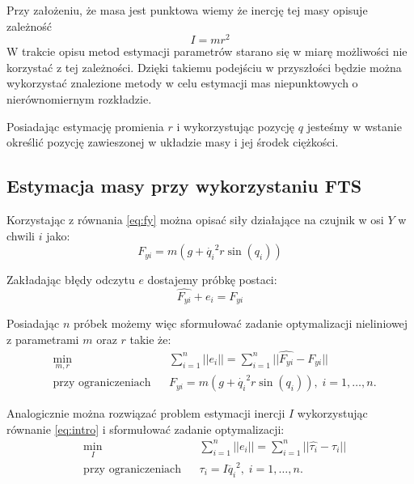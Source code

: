 \documentclass[12pt,a4paper]{article}
\begin{document}
	Przy założeniu, że masa jest punktowa wiemy że inercję tej masy opisuje zależność
	\begin{equation}
	I = mr^2
	\end{equation}
	W trakcie opisu metod estymacji parametrów starano się w miarę możliwości nie korzystać z tej zależności. Dzięki takiemu podejściu w przyszłości będzie można wykorzystać znalezione metody w celu estymacji mas niepunktowych o nierównomiernym rozkładzie.
	
	Posiadając estymację promienia $r$ i wykorzystując pozycję $q$ jesteśmy w wstanie określić pozycję zawieszonej w układzie masy i jej środek ciężkości.
	
	
	\subsection{Estymacja masy przy wykorzystaniu FTS}
	\label{sec:ftsods}
	Korzystając z równania \ref{eq:fy} można opisać siły działające na czujnik w osi $Y$ w chwili $i$ jako:
	\begin{equation}
	F_{yi}  = m(g + \dot{q_i}^2r\sin{(q_i)})
	\end{equation}
	
	Zakładając błędy odczytu $e$ dostajemy próbkę postaci:
	\begin{equation}
	\hat{F_{yi}}+e_i  = F_{yi}
	\end{equation}
	
	Posiadając $n$ próbek możemy więc sformułować zadanie optymalizacji nieliniowej z parametrami $m$ oraz $r$ takie że:
	\begin{equation}
	\begin{aligned}
	& \underset{m, r}{\text{min}}
	& & \sum_{i = 1}^{n} || e_i || = \sum_{i = 1}^{n} || \hat{F_{yi}} - F_{yi} || \\
	& \text{przy ograniczeniach}
	& & F_{yi} = m(g + \dot{q_i}^2r\sin{(q_i)}), \; i = 1, \ldots, n.
	\end{aligned}
	\end{equation}
	
	Analogicznie można rozwiązać problem estymacji inercji $I$ wykorzystując równanie \ref{eq:intro} i sformułować zadanie optymalizacji:
	\begin{equation}
	\begin{aligned}
	& \underset{I}{\text{min}}
	& & \sum_{i = 1}^{n} || e_i || = \sum_{i = 1}^{n} || \hat{\tau_{i}} - \tau_{i} || \\
	& \text{przy ograniczeniach}
	& & \tau_{i} = I\ddot{q_i}^2, \; i = 1, \ldots, n.
	\end{aligned}
	\end{equation}
	
\end{document}
